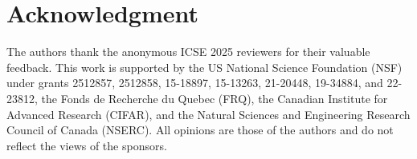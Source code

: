 \section[Acknowledgment]{Acknowledgment}
\label{sec:Acknowledgment}

The authors thank the anonymous ICSE 2025 reviewers for their valuable feedback. This work is supported by the US National Science Foundation (NSF) under grants 2512857, 2512858, 15-18897, 15-13263, 21-20448, 19-34884, and 22-23812, the Fonds de Recherche du Quebec (FRQ), the Canadian Institute for Advanced Research (CIFAR), and the Natural Sciences and Engineering Research Council of Canada (NSERC).
All opinions are those of the authors and do not reflect the views of the sponsors.



